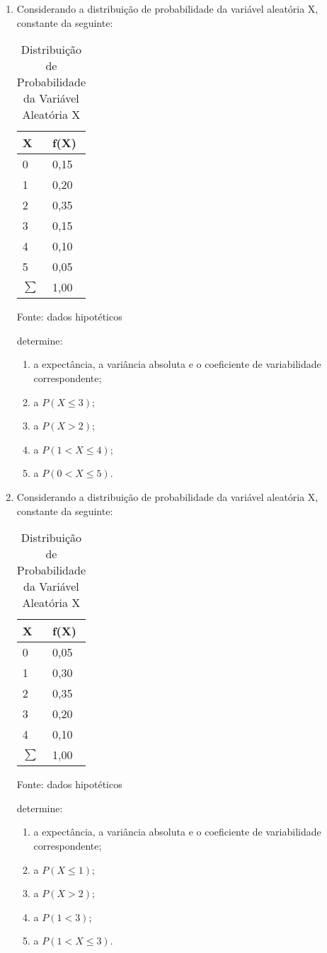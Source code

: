 \begin{enumerate}[resume]
\item Considerando a distribuição de probabilidade da variável aleatória X, constante da seguinte:
	\begin{table}[!htb]
	\centering
	\caption{Distribuição de Probabilidade da Variável Aleatória X}
	\vspace{0.5cm}
	\begin{tabular}{ll}
	X & f(X) \\
	\hline 
	0 & 0,15 \\
	1 & 0,20 \\
	2 & 0,35 \\
	3 & 0,15 \\
	4 & 0,10 \\
	5 & 0,05 \\
	\hline
	$\sum$ & 1,00
	\end{tabular}
	 \newline \newline Fonte: dados hipotéticos
	\end{table}
	determine:
	\begin{enumerate}
	\item a expectância, a variância absoluta e o coeficiente de variabilidade correspondente;
	\item a $P(X \leq 3)$;
	\item a $P(X > 2)$;
	\item a $P(1 < X \leq 4)$;
	\item a $P(0 < X \leq 5)$.			
	\end{enumerate}
	
\item Considerando a distribuição de probabilidade da variável aleatória X, constante da seguinte:
	\begin{table}[!htb]
	\centering
	\caption{Distribuição de Probabilidade da Variável Aleatória X}
	\vspace{0.5cm}
	\begin{tabular}{ll}
	X & f(X) \\
	\hline 
	0 & 0,05 \\
	1 & 0,30 \\
	2 & 0,35 \\
	3 & 0,20 \\
	4 & 0,10 \\
	\hline
	$\sum$ & 1,00
	\end{tabular}
	 \newline \newline Fonte: dados hipotéticos
	\end{table}
	determine:
	\begin{enumerate}
	\item a expectância, a variância absoluta e o coeficiente de variabilidade correspondente;
	\item a $P(X \leq 1)$;
	\item a $P(X > 2)$;
	\item a $P(1 < 3)$;
	\item a $P(1 < X \leq 3)$.			
	\end{enumerate}	
	
\end{enumerate}  